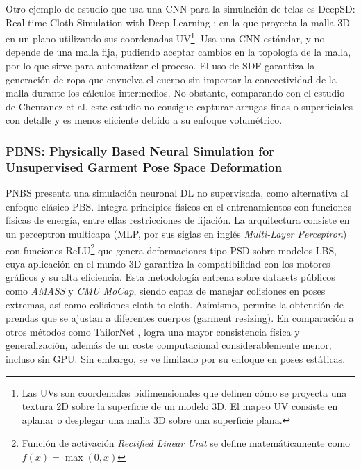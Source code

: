 Otro ejemplo de estudio que usa una CNN para la simulación de telas es DeepSD: Real-time Cloth Simulation with Deep Learning \cite{bertiche_deepsd_2021}; en la que proyecta la malla 3D en un plano utilizando sus coordenadas UV\footnote{Las UVs son coordenadas bidimensionales que definen cómo se proyecta una textura 2D sobre la superficie de un modelo 3D. El mapeo UV consiste en aplanar o desplegar una malla 3D sobre una superficie plana. }. Usa una CNN estándar, y no depende de una malla fija, pudiendo aceptar cambios en la topología de la malla, por lo que sirve para automatizar el proceso. El uso de SDF garantiza la generación de ropa que envuelva el cuerpo sin importar la concectividad de la malla durante los cálculos intermedios. No obstante, comparando con el estudio de  Chentanez et al. este estudio no consigue capturar arrugas finas o superficiales con detalle y es menos eficiente debido a su enfoque volumétrico. 

\subsubsection{PBNS: Physically Based Neural Simulation for Unsupervised Garment Pose Space Deformation}
PNBS \cite{bertiche2021PBNS} presenta una simulación neuronal DL no supervisada, como alternativa al enfoque clásico PBS. Integra principios físicos en el entrenamientos con funciones físicas de energía, entre ellas restricciones de fijación. La arquitectura consiste en un perceptron multicapa (MLP, por sus siglas en inglés \textit{Multi-Layer Perceptron}) con funciones ReLU\footnote{Función de activación \textit{Rectified Linear Unit} se define matemáticamente como $f(x) = \max(0, x)$} que genera deformaciones tipo PSD sobre modelos LBS, cuya aplicación en el mundo 3D garantiza la compatibilidad con los motores gráficos y su alta eficiencia. Esta metodología entrena sobre datasets públicos como \textit{AMASS} \cite{mahmood2019AMASS} y \textit{CMU MoCap}, siendo capaz de manejar colisiones en poses extremas, así como colisiones cloth-to-cloth. Asimismo, permite la obtención de  prendas que se ajustan a diferentes cuerpos (garment resizing). En comparación a otros métodos como TailorNet \cite{patel2020tailornet}, logra una mayor consistencia física y generalización, además de un coste computacional considerablemente menor, incluso sin GPU. Sin embargo, se ve limitado por su enfoque en poses estáticas.

